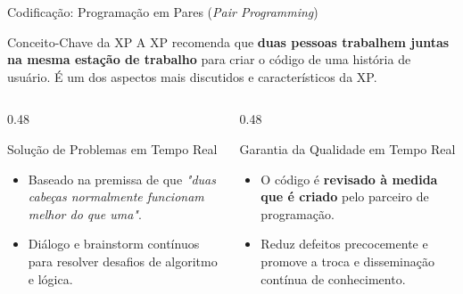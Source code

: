 \documentclass[aspectratio=169, 9pt]{beamer}
\begin{document}
\begin{frame}{Codificação: Programação em Pares (\textit{Pair Programming})}
  \begin{block}{Conceito-Chave da XP}
    A XP recomenda que \textbf{duas pessoas trabalhem juntas na mesma estação de trabalho} para criar o código de uma história de usuário. É um dos aspectos mais discutidos e característicos da XP.
  \end{block}

  \vspace{0.3cm}

  \begin{columns}[T]
    \begin{column}{0.48\textwidth}
      \begin{exampleblock}{Solução de Problemas em Tempo Real}
        \begin{itemize}
          \item Baseado na premissa de que \textit{"duas cabeças normalmente funcionam melhor do que uma"}.
          \item Diálogo e brainstorm contínuos para resolver desafios de algoritmo e lógica.
        \end{itemize}
      \end{exampleblock}
    \end{column}

    \begin{column}{0.48\textwidth}
      \begin{alertblock}{Garantia da Qualidade em Tempo Real}
        \begin{itemize}
          \item O código é \textbf{revisado à medida que é criado} pelo parceiro de programação.
          \item Reduz defeitos precocemente e promove a troca e disseminação contínua de conhecimento.
        \end{itemize}
      \end{alertblock}
    \end{column}
  \end{columns}
\end{frame}
\end{document}
